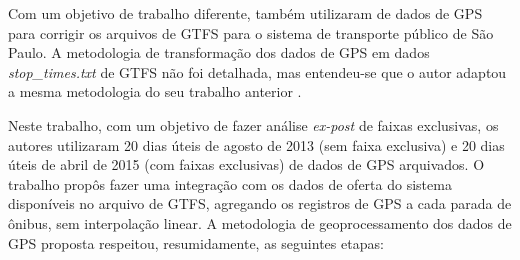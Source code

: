 \documentclass[        
    a4paper,          %
    12pt,             %
    chapter=TITLE,    %
    section=Title,    %
    subsection=Title, %
    oneside,          %
    english,          %
    spanish,          %
    brazil,           %
    fleqn             %
]{abntex2}
\begin{document}
  \begin{figure}[!h]
  \captionsetup{width=16cm}
  \centering
  \end{figure}
  
  Com um objetivo de trabalho diferente, \citet{Arbex2016a} também utilizaram de dados de GPS para corrigir os arquivos de GTFS para o sistema de transporte público de São Paulo. A metodologia de transformação dos dados de GPS em dados \emph{stop\_times.txt} de GTFS não foi detalhada, mas entendeu-se que o autor adaptou a mesma metodologia do seu trabalho anterior \citep{Arbex2016}.
  
  Neste trabalho, com um objetivo de fazer análise \emph{ex-post} de faixas exclusivas, os autores utilizaram 20 dias úteis de agosto de 2013 (sem faixa exclusiva) e 20 dias úteis de abril de 2015 (com faixas exclusivas) de dados de GPS arquivados. O trabalho propôs fazer uma integração com os dados de oferta do sistema disponíveis no arquivo de GTFS, agregando os registros de GPS a cada parada de ônibus, sem interpolação linear. A metodologia de geoprocessamento dos dados de GPS proposta respeitou, resumidamente, as seguintes etapas:
  
\end{document}
